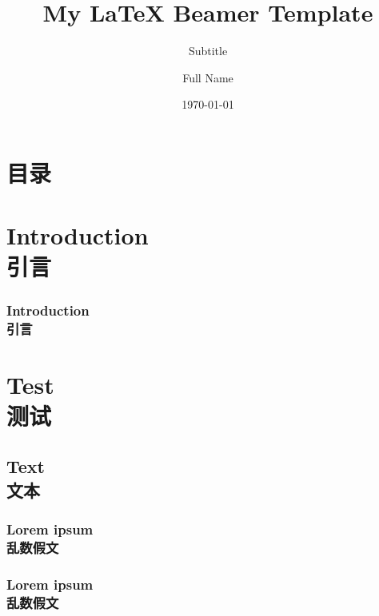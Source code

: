 \documentclass[aspectratio=169]{ctexbeamer}
\begin{document}
\title{
My \LaTeX%
Beamer Template
}
\subtitle{Subtitle}
\author[Name]{Full Name}
\date{\today}

\begin{frame}
\maketitle
\end{frame}

\section*{目录}
\begin{frame}
\frametitle{\secname}
\tableofcontents[hideallsubsections]
\end{frame}

\section{Introduction\\引言}
\begin{frame}
\frametitle{Introduction\\引言}
\lipsum[1]
\end{frame}

\begin{frame}
\zhlipsum[1]
\end{frame}

\section{Test\\测试}
\subsection{Text\\文本}
\subsubsection{Lorem ipsum\\乱数假文}
\begin{frame}
\frametitle{Lorem ipsum\\乱数假文}
\lipsum[2]
\end{frame}

\begin{frame}
\zhlipsum[2]
\end{frame}
\end{document}
